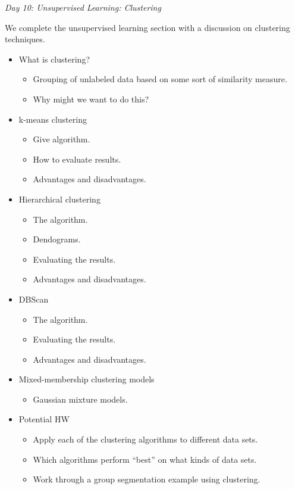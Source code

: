 \documentclass[12pt]{article}
\begin{document}
	\vspace{2mm}
	\noindent
	\textit{\large{Day 10: Unsupervised Learning: Clustering}}
	
	\noindent
	We complete the unsupervised learning section with a discussion on clustering techniques.
	\begin{itemize}
		\item What is clustering?
		\begin{itemize}
			\item Grouping of unlabeled data based on some sort of similarity measure.
			\item Why might we want to do this?
		\end{itemize}
		\item k-means clustering
		\begin{itemize}
			\item Give algorithm.
			\item How to evaluate results.
			\item Advantages and disadvantages.
		\end{itemize}
		\item Hierarchical clustering
		\begin{itemize}
			\item The algorithm.
			\item Dendograms.
			\item Evaluating the results.
			\item Advantages and disadvantages.
		\end{itemize}
		\item DBScan
		\begin{itemize}
			\item The algorithm.
			\item Evaluating the results.
			\item Advantages and disadvantages.
		\end{itemize}
		\item Mixed-membership clustering models
		\begin{itemize}
			\item Gaussian mixture models.
		\end{itemize}
		\item Potential HW
		\begin{itemize}
			\item Apply each of the clustering algorithms to different data sets.
			\item Which algorithms perform ``best'' on what kinds of data sets.
			\item Work through a group segmentation example using clustering.
		\end{itemize}
	\end{itemize}
	
\end{document}
